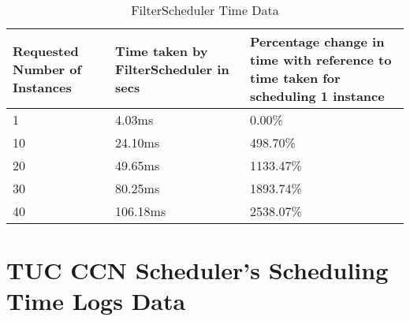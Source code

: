 \begin{table}[!htb]
	\centering
		\begin{tabular}{|| p{10em} | p{10em} | p{10em} ||}
			\hline
			{Requested Number of Instances} & {Time taken by FilterScheduler in secs} & {Percentage change in time with reference to time taken for scheduling 1 instance} \\ [1ex] 
			\hline
			\hline
			1  & 4.03ms  & 0.00\% \\
			\hline
			10 & 24.10ms  & 498.70\% \\
			\hline
			20 & 49.65ms  & 1133.47\% \\
			\hline
			30 & 80.25ms  & 1893.74\% \\
			\hline
			40 & 106.18ms & 2538.07\% \\
			\hline
		\end{tabular}
	\caption{FilterScheduler Time Data}\label{tabular:filterschedulerlogdata}
\end{table}



\section{TUC CCN Scheduler's Scheduling Time Logs Data}\label{app:sec:tucschedulerlogdata}

